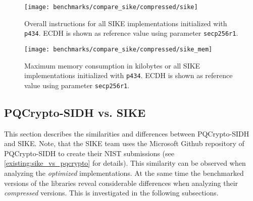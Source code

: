 \begin{figure}[H]
  \centering
  \texttt{[image: benchmarks/compare\_sike/compressed/sike]}
  \caption[Overall instructions \gls{SIKE}]
  {Overall instructions for all \gls{SIKE} implementations initialized with \texttt{p434}. \gls{ECDH} is shown as reference value using parameter \texttt{secp256r1}.}
  \label{fig:results_sike}
\end{figure}

\begin{figure}[H]
  \centering
  \texttt{[image: benchmarks/compare\_sike/compressed/sike\_mem]}
  \caption[Maximum memory consumption \gls{SIKE}]
  {Maximum memory consumption in kilobytes or all \gls{SIKE} implementations initialized with \texttt{p434}. \gls{ECDH} is shown as reference value using parameter \texttt{secp256r1}.}
  \label{fig:results_sike_mem}
\end{figure}

\subsection{\gls{PQCrypto-SIDH} vs. \gls{SIKE}} \label{sec:pqc_vs_sike}

This section describes the similarities and differences between \gls{PQCrypto-SIDH} and \gls{SIKE}. Note, that the \gls{SIKE} team uses the Microsoft Github repository of \gls{PQCrypto-SIDH} to create their \gls{NIST} submissions (see \autoref{existing:sike_vs_pqcrypto} for details). This similarity can be observed when analyzing the \textit{optimized} implementations. At the same time the benchmarked versions of the libraries reveal considerable differences when analyzing their \textit{compressed} versions. This is investigated in the following subsections.

